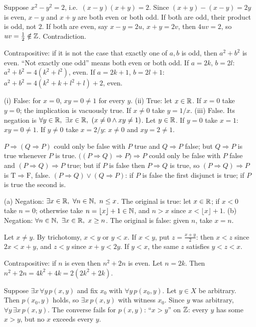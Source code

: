  Suppose $x^2-y^2=2$, i.e.\ $(x-y)(x+y)=2$. Since $(x+y)-(x-y)=2y$ is even, $x-y$ and $x+y$ are both even or both odd. If both are odd, their product is odd, not $2$. If both are even, say $x-y=2u$, $x+y=2v$, then $4uv=2$, so $uv=\frac12\notin\mathbb{Z}$. Contradiction.

 Contrapositive: if it is not the case that exactly one of $a,b$ is odd, then $a^2+b^2$ is even. ``Not exactly one odd'' means both even or both odd. If $a=2k$, $b=2l$: $a^2+b^2=4(k^2+l^2)$, even. If $a=2k+1$, $b=2l+1$: $a^2+b^2=4(k^2+k+l^2+l)+2$, even.

 (i) False: for $x=0$, $xy=0\ne1$ for every $y$. (ii) True: let $x\in\mathbb{R}$. If $x=0$ take $y=0$; the implication is vacuously true. If $x\ne0$ take $y=1/x$. (iii) False. Its negation is $\forall y\in\R,\ \exists x\in\R,\ (x\ne0\wedge xy\ne1)$. Let $y\in\mathbb{R}$. If $y=0$ take $x=1$: $xy=0\ne1$. If $y\ne0$ take $x=2/y$: $x\ne0$ and $xy=2\ne1$.

 $P\Rightarrow(Q\Rightarrow P)$ could only be false with $P$ true and $Q\Rightarrow P$ false; but $Q\Rightarrow P$ is true whenever $P$ is true. $\big((P\Rightarrow Q)\Rightarrow P\big)\Rightarrow P$ could only be false with $P$ false and $(P\Rightarrow Q)\Rightarrow P$ true; but if $P$ is false then $P\Rightarrow Q$ is true, so $(P\Rightarrow Q)\Rightarrow P$ is $\mathrm T\Rightarrow\mathrm F$, false. $(P\Rightarrow Q)\vee(Q\Rightarrow P)$: if $P$ is false the first disjunct is true; if $P$ is true the second is.

 (a) Negation: $\exists x\in\mathbb{R},\ \forall n\in\mathbb{N},\ n\le x$. The original is true: let $x\in\mathbb{R}$; if $x<0$ take $n=0$; otherwise take $n=\lfloor x\rfloor+1\in\mathbb{N}$, and $n>x$ since $x<\lfloor x\rfloor+1$. (b) Negation: $\forall n\in\mathbb{N},\ \exists x\in\mathbb{R},\ x\ge n$. The original is false: given $n$, take $x=n$.

 Let $x\ne y$. By trichotomy, $x<y$ or $y<x$. If $x<y$, put $z=\frac{x+y}2$: then $x<z$ since $2x<x+y$, and $z<y$ since $x+y<2y$. If $y<x$, the same $z$ satisfies $y<z<x$.

 Contrapositive: if $n$ is even then $n^2+2n$ is even. Let $n=2k$. Then $n^2+2n=4k^2+4k=2(2k^2+2k)$.

 Suppose $\exists x\,\forall y\,p(x,y)$ and fix $x_0$ with $\forall y\,p(x_0,y)$. Let $y\in X$ be arbitrary. Then $p(x_0,y)$ holds, so $\exists x\,p(x,y)$ with witness $x_0$. Since $y$ was arbitrary, $\forall y\,\exists x\,p(x,y)$. The converse fails for $p(x,y)$: ``$x>y$'' on $\mathbb{Z}$: every $y$ has some $x>y$, but no $x$ exceeds every $y$.

